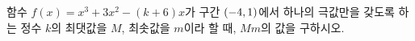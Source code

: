 함수 $f(x)=x^3+3x^2-(k+6)x$가 구간 $(-4{,}\mkern3mu\mathopen{}1)$에서 하나의 극값만을 갖도록 하는 정수 $k$의 최댓값을 $M$, 최솟값을 $m$이라 할 때, $Mm$의 값을 구하시오.
